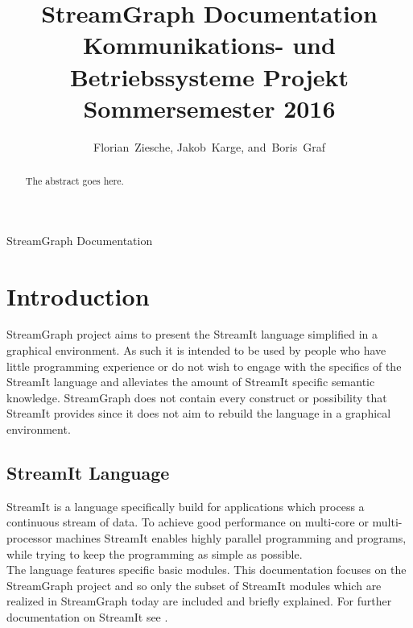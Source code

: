 \documentclass[journal]{IEEEtran}
\begin{document}
\title{StreamGraph Documentation\\ Kommunikations- und Betriebssysteme Projekt Sommersemester 2016}
\author{Florian~Ziesche, Jakob~Karge, and~Boris~Graf}

%
{StreamGraph Documentation}


\maketitle

\begin{abstract}
The abstract goes here.
\end{abstract}


\section{Introduction}
 StreamGraph project aims to present the StreamIt language
simplified in a graphical environment. As such it is intended to be used by
people who have little programming experience or do not wish to engage with the
specifics of the StreamIt language and alleviates the amount of StreamIt
specific semantic knowledge. StreamGraph does not contain every construct
or possibility that StreamIt provides since it does not aim to rebuild the
language in a graphical environment.



\subsection{StreamIt Language}
\noindent StreamIt is a language specifically build for applications which
process a continuous stream of data. To achieve good performance on multi-core
or multi-processor machines StreamIt enables highly parallel programming and
programs, while trying to keep the programming as simple as possible.\\

The language features specific basic modules. This documentation focuses on the
StreamGraph project and so only the subset of StreamIt modules which are
realized in StreamGraph today are included and briefly explained. For further
documentation on StreamIt see \cite{streamIt}.\\
\end{document}
